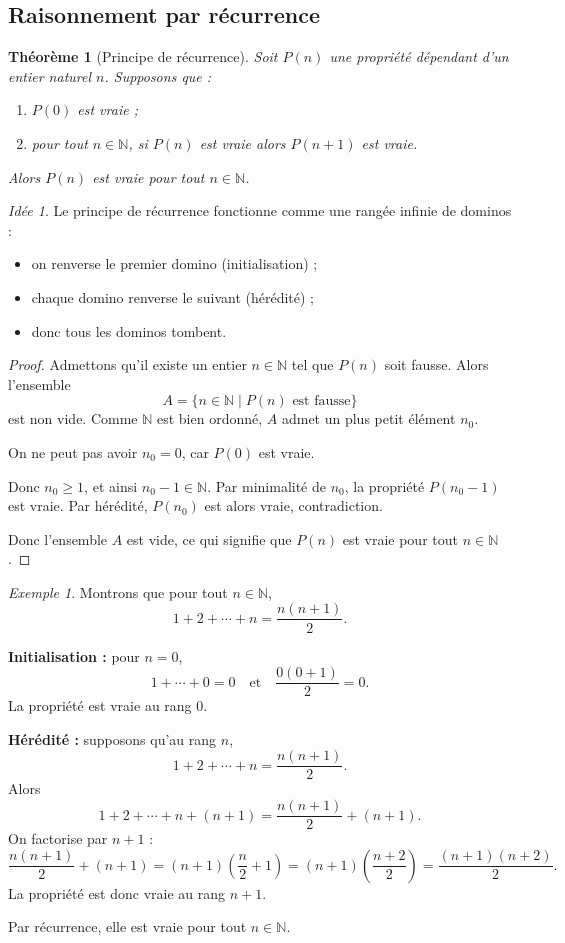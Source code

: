 \documentclass[11pt,a4paper]{article}
\newtheorem{theoreme}[definition]{Théorème}
\theoremstyle{remark}
\newtheorem{exemple}[definition]{Exemple}
\newtheorem*{idee}{Idée}
\newcommand{\N}{\mathbb{N}}
\begin{document}
\subsection{Raisonnement par récurrence}

\begin{theoreme}[Principe de récurrence]
Soit \(P(n)\) une propriété dépendant d’un entier naturel \(n\). Supposons que :
\begin{enumerate}
    \item \(P(0)\) est vraie ;
    \item pour tout \(n\in\N\), si \(P(n)\) est vraie alors \(P(n+1)\) est vraie.
\end{enumerate}
Alors \(P(n)\) est vraie pour tout \(n\in\N\).
\end{theoreme}

\begin{idee}
Le principe de récurrence fonctionne comme une rangée infinie de dominos :
\begin{itemize}
    \item on renverse le premier domino (initialisation) ;
    \item chaque domino renverse le suivant (hérédité) ;
    \item donc tous les dominos tombent.
\end{itemize}
\end{idee}

\begin{proof}
Admettons qu’il existe un entier \(n\in\N\) tel que \(P(n)\) soit fausse. Alors l’ensemble
\[
A=\{n\in\N\mid P(n)\text{ est fausse}\}
\]
est non vide. Comme \(\N\) est bien ordonné, \(A\) admet un plus petit élément \(n_0\).

On ne peut pas avoir \(n_0=0\), car \(P(0)\) est vraie.

Donc \(n_0\geq 1\), et ainsi \(n_0-1\in\N\). Par minimalité de \(n_0\), la propriété \(P(n_0-1)\) est vraie. Par hérédité, \(P(n_0)\) est alors vraie, contradiction.

Donc l’ensemble \(A\) est vide, ce qui signifie que \(P(n)\) est vraie pour tout \(n\in\N\).
\end{proof}

\begin{exemple}
Montrons que pour tout \(n\in\N\),
\[
1+2+\cdots+n=\frac{n(n+1)}{2}.
\]

\textbf{Initialisation :} pour \(n=0\),
\[
1+\cdots+0=0
\quad \text{et} \quad
\frac{0(0+1)}{2}=0.
\]
La propriété est vraie au rang \(0\).

\textbf{Hérédité :} supposons qu’au rang \(n\),
\[
1+2+\cdots+n=\frac{n(n+1)}{2}.
\]
Alors
\[
1+2+\cdots+n+(n+1)
=
\frac{n(n+1)}{2}+(n+1).
\]
On factorise par \(n+1\) :
\[
\frac{n(n+1)}{2}+(n+1)
=
(n+1)\left(\frac{n}{2}+1\right)
=
(n+1)\left(\frac{n+2}{2}\right)
=
\frac{(n+1)(n+2)}{2}.
\]
La propriété est donc vraie au rang \(n+1\).

Par récurrence, elle est vraie pour tout \(n\in\N\).
\end{exemple}
\end{document}
